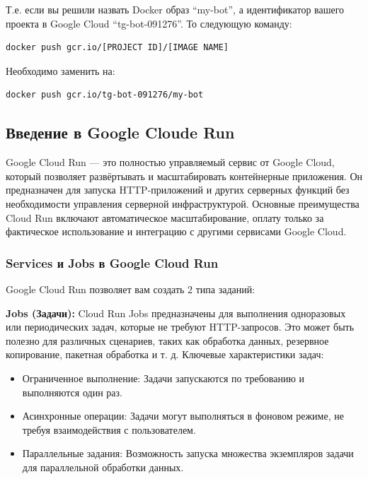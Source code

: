 \documentclass[
]{book}
\providecommand{\tightlist}{%
  \setlength{\itemsep}{0pt}\setlength{\parskip}{0pt}}
\begin{document}
Т.е. если вы решили назвать Docker образ ``my-bot'', а идентификатор вашего проекта в Google Cloud ``tg-bot-091276''. То следующую команду:

\begin{verbatim}
docker push gcr.io/[PROJECT ID]/[IMAGE NAME]
\end{verbatim}

Необходимо заменить на:

\begin{verbatim}
docker push gcr.io/tg-bot-091276/my-bot
\end{verbatim}

\subsection{Введение в Google Cloude Run}\label{ux432ux432ux435ux434ux435ux43dux438ux435-ux432-google-cloude-run}

Google Cloud Run --- это полностью управляемый сервис от Google Cloud, который позволяет развёртывать и масштабировать контейнерные приложения. Он предназначен для запуска HTTP-приложений и других серверных функций без необходимости управления серверной инфраструктурой. Основные преимущества Cloud Run включают автоматическое масштабирование, оплату только за фактическое использование и интеграцию с другими сервисами Google Cloud.

\subsubsection{Services и Jobs в Google Cloud Run}\label{services-ux438-jobs-ux432-google-cloud-run}

Google Cloud Run позволяет вам создать 2 типа заданий:

\textbf{Jobs (Задачи):}
Cloud Run Jobs предназначены для выполнения одноразовых или периодических задач, которые не требуют HTTP-запросов. Это может быть полезно для различных сценариев, таких как обработка данных, резервное копирование, пакетная обработка и т. д. Ключевые характеристики задач:

\begin{itemize}
\tightlist
\item
  Ограниченное выполнение: Задачи запускаются по требованию и выполняются один раз.
\item
  Асинхронные операции: Задачи могут выполняться в фоновом режиме, не требуя взаимодействия с пользователем.
\item
  Параллельные задания: Возможность запуска множества экземпляров задачи для параллельной обработки данных.
\end{itemize}
\end{document}
